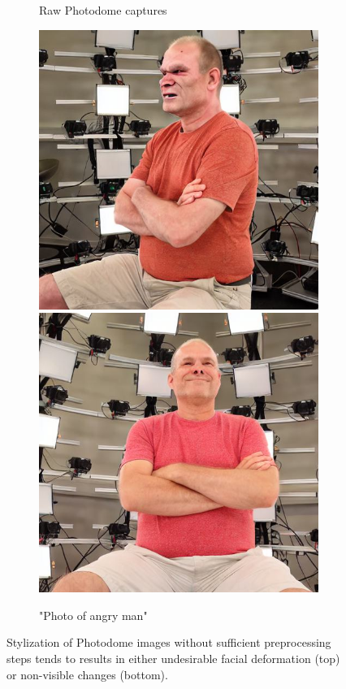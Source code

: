 \begin{figure}
\begin{subfigure}{0.48\linewidth}
		\caption{Raw Photodome captures}
	\end{subfigure}
	\begin{subfigure}{0.48\linewidth}
		\includegraphics[width=\textwidth]{Figures/failed/sd_unprocessed/0-1-5-1-294_210300_834.JPG}
        \includegraphics[width=\textwidth]{Figures/failed/sd_unprocessed/0-2-6-2-303_210300_871.JPG}
		\caption{"Photo of angry man"}
	\end{subfigure}
	\caption{Stylization of Photodome images without sufficient preprocessing steps tends to results in either undesirable facial deformation (top) or non-visible changes (bottom).}
	\label{fig:unpreprocessed}
\end{figure}


